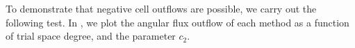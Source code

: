 To demonstrate that negative cell outflows are possible, we carry out the following test.
In , we plot the angular flux outflow of each method as a function of trial space degree, and the parameter $c_2$.
\begin{figure}[!htp]
\begin{center}
\end{center}
\end{figure}
